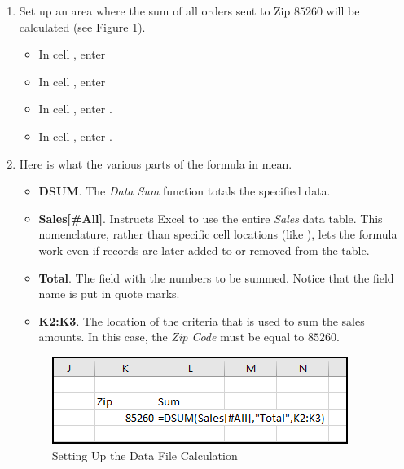 \begin{enumbox}
	\begin{enumerate}
		\item Set up an area where the sum of all orders sent to Zip $ 85260 $ will be calculated (see Figure \ref{09:fig21}).
	
		\begin{itemize}
			\item In cell , enter 
			\item In cell , enter 
			\item In cell , enter  . 
			\item In cell , enter . 
		\end{itemize}
	
		\item Here is what the various parts of the formula in  mean.		
	
		\begin{itemize}
			\item \textbf{DSUM}. The \textit{Data Sum} function totals the specified data.
			\item \textbf{Sales[\#All]}. Instructs Excel to use the entire \textit{Sales} data table. This nomenclature, rather than specific cell locations (like ), lets the formula work even if records are later added to or removed from the table.
			\item \textbf{Total}. The field with the numbers to be summed. Notice that the field name is put in quote marks.
			\item \textbf{K2:K3}. The location of the criteria that is used to sum the sales amounts. In this case, the \textit{Zip Code} must be equal to $ 85260 $.
		\end{itemize}	
	
		\begin{figure}[H]
			\centering
			\includegraphics[width=\maxwidth{.75\linewidth}]{gfx/ch09_fig21}
			\caption{Setting Up the Data File Calculation}
			\label{09:fig21}
		\end{figure}
	

\end{enumerate}
\end{enumbox}
